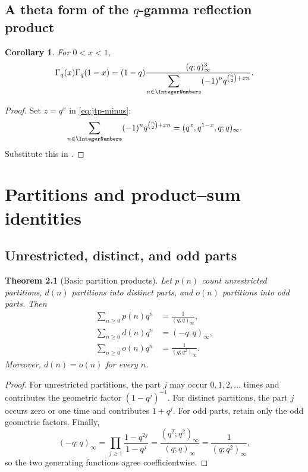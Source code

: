 \documentclass[11pt,a4paper,oneside,openany]{book}
\newtheorem{theorem}{Theorem}[chapter]
\newtheorem{corollary}[corollary]{Corollary}
\theoremstyle{definition}
\theoremstyle{remark}
\begin{document}
\section{A theta form of the \texorpdfstring{$q$}{q}-gamma reflection product}

\begin{corollary}\label{cor:qgamma-theta}
For $0<x<1$,
\[
 \Gamma_q(x)\Gamma_q(1-x)
 =(1-q)\frac{(q;q)_\infty^3}
 {\displaystyle\sum_{n\in\IntegerNumbers}(-1)^n
 q^{\binom n2+xn}}.
\]
\end{corollary}

\begin{proof}
Set $z=q^x$ in \eqref{eq:jtp-minus}:
\[
 \sum_{n\in\IntegerNumbers}(-1)^nq^{\binom n2+xn}
 =(q^x,q^{1-x},q;q)_\infty.
\]
Substitute this in .
\end{proof}

\chapter{Partitions and product--sum identities}\label{chap:partitions}

\section{Unrestricted, distinct, and odd parts}

\begin{theorem}[Basic partition products]\label{thm:partition-products}
Let $p(n)$ count unrestricted partitions, $d(n)$ partitions into distinct parts, and $o(n)$ partitions into odd parts.  Then
\begin{align*}
 \sum_{n\ge0}p(n)q^n&=\frac1{(q;q)_\infty},\\
 \sum_{n\ge0}d(n)q^n&=(-q;q)_\infty,\\
 \sum_{n\ge0}o(n)q^n&=\frac1{(q;q^2)_\infty}.
\end{align*}
Moreover, $d(n)=o(n)$ for every $n$.
\end{theorem}

\begin{proof}
For unrestricted partitions, the part $j$ may occur $0,1,2,\dots$ times and contributes the geometric factor $(1-q^j)^{-1}$.  For distinct partitions, the part $j$ occurs zero or one time and contributes $1+q^j$.  For odd parts, retain only the odd geometric factors.  Finally,
\[
 (-q;q)_\infty
 =\prod_{j\ge1}\frac{1-q^{2j}}{1-q^j}
 =\frac{(q^2;q^2)_\infty}{(q;q)_\infty}
 =\frac1{(q;q^2)_\infty},
\]
so the two generating functions agree coefficientwise.
\end{proof}
\end{document}
